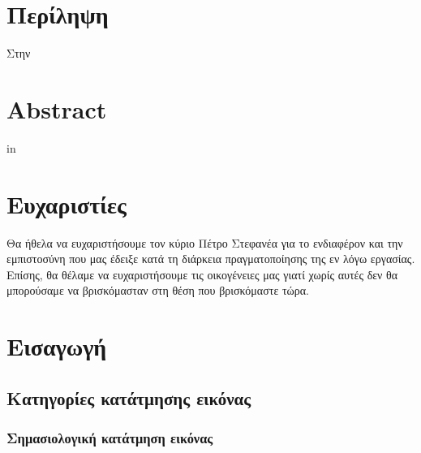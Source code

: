 \documentclass[12pt]{article}
\begin{document}
\newpage

\section*{Περίληψη}
Στην


\newpage
\mbox{}
\newpage

\section*{Abstract}
in



\newpage
\mbox{}
\newpage

\section*{Ευχαριστίες}
Θα ήθελα να ευχαριστήσουμε τον κύριο Πέτρο Στεφανέα για το ενδιαφέρον και την εμπιστοσύνη που
μας έδειξε κατά τη διάρκεια πραγματοποίησης της εν λόγω εργασίας. Επίσης, θα θέλαμε να ευχαριστήσουμε
τις οικογένειες μας γιατί χωρίς αυτές δεν θα μπορούσαμε να βρισκόμασταν στη θέση που βρισκόμαστε
τώρα.


\newpage
\mbox{}
\newpage


\tableofcontents

\newpage
\listoffigures
{}
\newpage
\listoftables
{}

\newpage
{}
\section{Εισαγωγή}

\subsection{Κατηγορίες κατάτμησης εικόνας}



\subsubsection{Σημασιολογική κατάτμηση εικόνας}
\end{document}
